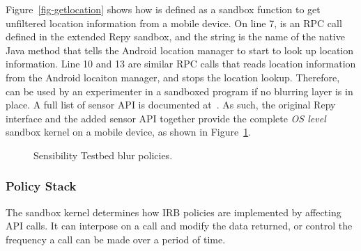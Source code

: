 Figure~\ref{fig-getlocation} shows how  
is defined as a sandbox function to get unfiltered location 
information from a mobile device. 
On line 7,  is an RPC call 
defined in the extended Repy sandbox, 
and the string  is the name of the native Java method that tells the Android 
location manager to start to look up location information. Line 10 and 13 are similar RPC 
calls that reads location information from the Android locaiton manager, and stops the location 
lookup. Therefore,  %
can be used by an experimenter in a sandboxed program if no blurring layer is in place.
A full list of sensor
API is documented at~\cite{sensor-api}. As
such, the original Repy interface and the added sensor API together 
provide the complete \textit{OS level} sandbox kernel on a mobile 
device, as shown in Figure~\ref{fig-blur}.

\begin{figure}
\caption{\small Sensibility Testbed blur policies. 
\label{fig-blur}}
\end{figure}

\subsubsection{Policy Stack}
The sandbox kernel determines how IRB policies are implemented by affecting API calls. It can
interpose on a call and modify the data returned, or control the frequency a call can be made over
a period of time. 

